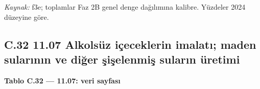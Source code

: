 \endgroup

\emph{Kaynak:} \etiketT{} f3e; toplamlar Faz 2B genel denge dağılımına kalibre. Yüzdeler 2024 düzeyine göre.

\hypertarget{nace_kartlar_10-12-c32-1107-alkolsuxfcz-iuxe7eceklerin-imalatux131-maden-sularux131nux131n-ve-diux11fer-ux15fiux15felenmiux15f-sularux131n-uxfcretimi}{%
\subsection{C.32 11.07 Alkolsüz içeceklerin imalatı; maden sularının ve diğer şişelenmiş suların üretimi}\label{nace_kartlar_10-12-c32-1107-alkolsuxfcz-iuxe7eceklerin-imalatux131-maden-sularux131nux131n-ve-diux11fer-ux15fiux15felenmiux15f-sularux131n-uxfcretimi}}


\textbf{Tablo C.32 --- 11.07: veri sayfası}

\nopagebreak[4]

\begingroup\gbtablo\small

